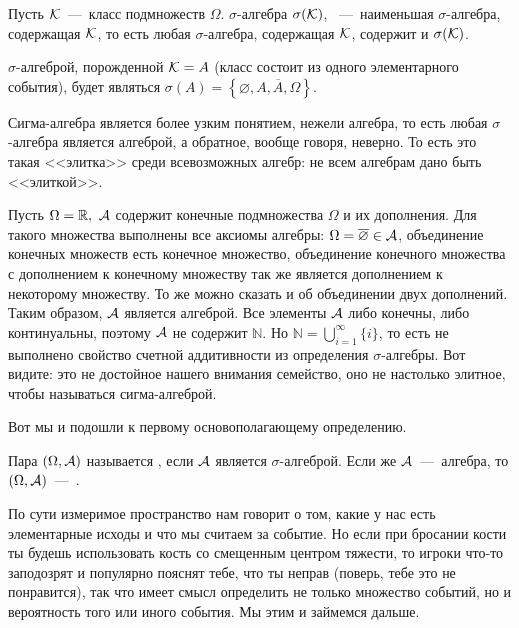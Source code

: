 \documentclass[../TV&MS.tex]{subfiles}
\begin{document}
\begin{Def}
	Пусть $\mathcal{K}$~---~класс подмножеств $\Omega$. $\sigma$-алгебра $\sigma(\mathcal{K})$,
	~---~наименьшая $\sigma$-алгебра, содержащая $\mathcal{K}$, 
	то есть любая $\sigma$-алгебра, содержащая $\mathcal{K}$, содержит и $\sigma(\mathcal{K})$.
\end{Def}

\begin{Ex}
    $\sigma$-алгеброй, порожденной $\mathcal{K} = A$ (класс состоит из одного элементарного события), будет являться 
	$\sigma(A) = \left\{ \varnothing, A, \overline{A}, \Omega \right\}$.
\end{Ex}

Сигма-алгебра является более узким понятием, нежели алгебра, то есть любая 
$\sigma$-алгебра является алгеброй, а обратное, вообще говоря, неверно.
То есть это такая <<элитка>> среди всевозможных алгебр: не всем алгебрам
дано быть <<элиткой>>.

\begin{Ex}
	Пусть $\Omega = \mathbb{R},\  \mathcal{A}$ содержит конечные подмножества $\Omega$ и их дополнения. 
	Для такого множества выполнены все аксиомы алгебры: $\Omega = \overline{\varnothing} \in \mathcal{A}$,
	объединение конечных множеств есть конечное множество, объединение конечного множества с 
	дополнением к конечному множеству так же является дополнением к некоторому множеству. 
	То же можно сказать и об объединении двух дополнений. Таким образом, $\mathcal{A}$ является алгеброй.
	Все элементы $\mathcal{A}$ либо конечны, либо континуальны, поэтому $\mathcal{A}$ не содержит $\mathbb{N}$. 
	Но $\mathbb{N} = \bigcup\limits_{i=1}^{\infty}\{i\}$, то есть не выполнено свойство счетной 
	аддитивности из определения $\sigma$-алгебры. Вот видите: это не достойное нашего внимания семейство,
	оно не настолько элитное, чтобы называться сигма-алгеброй.
\end{Ex}

	Вот мы и подошли к первому основополагающему определению.

\begin{Def}
	Пара $(\Omega, \mathcal{A})$ называется , если $\mathcal{A}$ является 
	$\sigma$-алгеброй. Если же $\mathcal{A}$~---~алгебра, то  $(\Omega, \mathcal{A})$~---~.
\end{Def}

По сути измеримое пространство нам говорит о том, какие у нас есть элементарные исходы 
и что мы считаем за событие. Но если при бросании кости ты будешь использовать кость 
со смещенным центром тяжести, то игроки что-то заподозрят и популярно пояснят тебе, что ты неправ
(поверь, тебе это не понравится), так что имеет смысл определить не только множество событий, 
но и вероятность того или иного события. Мы этим и займемся дальше.
\end{document}

